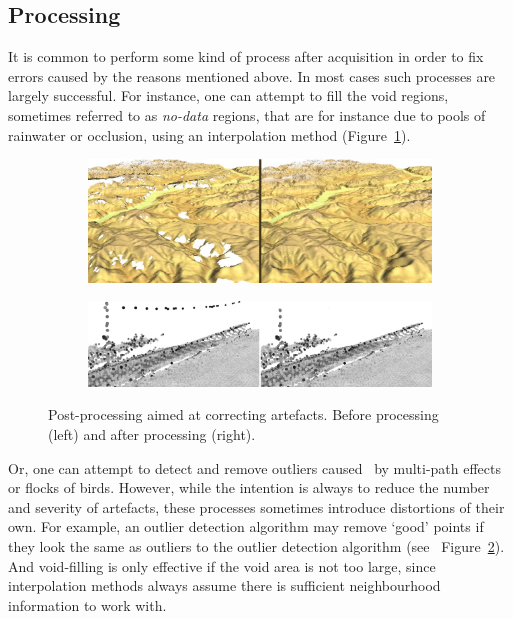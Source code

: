 \subsection{Processing}
It is common to perform some kind of process after acquisition in order to fix errors caused by the reasons mentioned above. 
In most cases such processes are largely successful. 
For instance, one can attempt to fill the void regions, sometimes referred to as \emph{no-data} regions, that are for instance due to pools of rainwater or occlusion, using an interpolation method (Figure~\ref{fig:voidfill}).
\begin{figure}
	\centering
	\begin{subfigure}{0.9\linewidth}
		\includegraphics[width=\textwidth]{figs/srtm_trento_voidfill.png}
		\label{fig:voidfill}
	\end{subfigure}
	\begin{subfigure}{0.9\linewidth}
		\includegraphics[width=\textwidth]{figs/ourlier-detection-wrong.png}
				\label{fig:outlier-wrong}
	\end{subfigure}
	\caption{Post-processing aimed at correcting artefacts. Before processing (left) and after processing (right).}%
	\label{fig:processing}
\end{figure}
Or, one can attempt to detect and remove outliers caused \eg\ by multi-path effects or flocks of birds. 
However, while the intention is always to reduce the number and severity of artefacts, these processes sometimes introduce distortions of their own.
For example, an outlier detection algorithm may remove `good' points if they look the same as outliers to the outlier detection algorithm (see \eg\ Figure~\ref{fig:outlier-wrong}).
And void-filling is only effective if the void area is not too large, since interpolation methods always assume there is sufficient neighbourhood information to work with.


